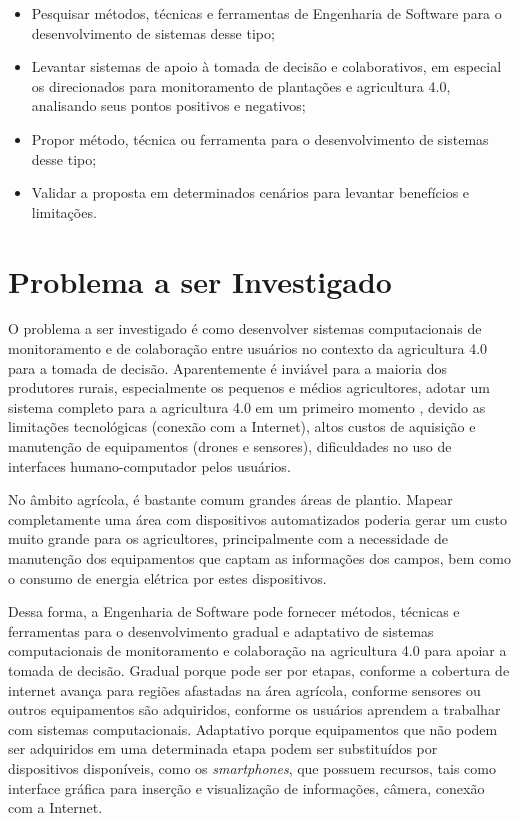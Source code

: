 \documentclass[12pt]{article}
\begin{document}
\begin{itemize}
	\item Pesquisar métodos, técnicas e ferramentas de Engenharia de Software para o desenvolvimento de sistemas desse tipo;
	\item Levantar sistemas de apoio à tomada de decisão e colaborativos, em especial os direcionados para monitoramento de plantações e agricultura 4.0, analisando seus pontos positivos e negativos;
	\item Propor método, técnica ou ferramenta para o desenvolvimento de sistemas desse tipo;
	\item Validar a proposta em determinados cenários para levantar benefícios e limitações.
\end{itemize}

\section{Problema a ser Investigado}
\label{sec:problema_investigado}

O problema a ser investigado é como desenvolver sistemas computacionais de monitoramento e de colaboração entre usuários no contexto da agricultura 4.0 para a tomada de decisão. Aparentemente é inviável para a maioria dos produtores rurais, especialmente os pequenos e médios agricultores, adotar um sistema completo para a agricultura 4.0 em um primeiro momento \cite{Rose:2019}, devido as limitações tecnológicas (conexão com a Internet), altos custos de aquisição e manutenção de equipamentos (drones e sensores), dificuldades no uso de interfaces humano-computador pelos usuários.

No âmbito agrícola, é bastante comum grandes áreas de plantio. Mapear completamente uma área com dispositivos automatizados poderia gerar um custo muito grande para os agricultores, principalmente com a necessidade de manutenção dos equipamentos que captam as informações dos campos, bem como o consumo de energia elétrica por estes dispositivos.

Dessa forma, a Engenharia de Software pode fornecer métodos, técnicas e ferramentas para o desenvolvimento gradual e adaptativo de sistemas computacionais de monitoramento e colaboração na agricultura 4.0 para apoiar a tomada de decisão. Gradual porque pode ser por etapas, conforme a cobertura de internet avança para regiões afastadas na área agrícola, conforme sensores ou outros equipamentos são adquiridos, conforme os usuários aprendem a trabalhar com sistemas computacionais. Adaptativo porque equipamentos que não podem ser adquiridos em uma determinada etapa podem ser substituídos por dispositivos disponíveis, como os \textit{smartphones}, que possuem recursos, tais como interface gráfica para inserção e visualização de informações, câmera, conexão com a Internet.
\end{document}
